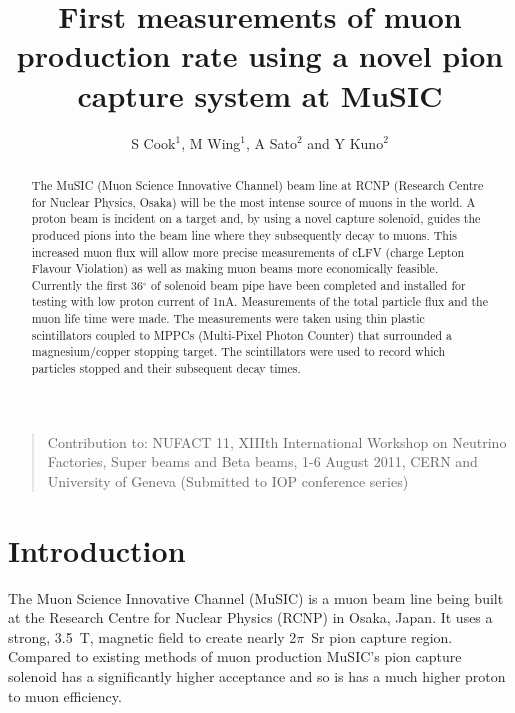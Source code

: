 \documentclass[a4paper]{jpconf}
\begin{document}
\title{First measurements of muon production rate using a novel pion capture system at MuSIC}

\author{S Cook$^1$, M Wing$^1$, A Sato$^2$ and Y Kuno$^2$}

\address{$^1$Department of Physics and Astronomy, University College London, Gower Street, London WC1E~6BT, UK}
\address{$^2$Department of Physics, Graduate School of Science, Osaka University.}


\begin{abstract}
The MuSIC (Muon Science Innovative Channel) beam line at RCNP (Research Centre for Nuclear Physics, Osaka) will be the most intense source of muons in the world. A proton beam is incident on a target and, by using a novel capture solenoid, guides the produced pions into the beam line where they subsequently decay to muons. This increased muon flux will allow more precise measurements of cLFV (charge Lepton Flavour Violation) as well as making muon beams more economically feasible. Currently the first 36$^{\circ}$ of solenoid beam pipe have been completed and installed for testing with low proton current of 1nA. Measurements of the total particle flux and the muon life time were made. The measurements were taken using thin plastic scintillators coupled to MPPCs (Multi-Pixel Photon Counter) that surrounded a magnesium/copper  stopping target. The scintillators were used to record which particles stopped and their subsequent decay times.
\end{abstract}    


\begin{quotation}
    \begin{center}
        Contribution to:
        NUFACT 11, XIIIth International Workshop on Neutrino Factories, Super beams and Beta beams, 1-6 August 2011, CERN and University of Geneva
        (Submitted to IOP conference series)
    \end{center}
\end{quotation}



\section{Introduction}
The Muon Science Innovative Channel (MuSIC) is a muon beam line being built at the Research Centre for Nuclear Physics (RCNP) in Osaka, Japan. It uses a strong, 3.5~T, magnetic field to create nearly 2$\pi$~Sr pion capture region. Compared to existing methods of muon production MuSIC's pion capture solenoid has a significantly higher acceptance and so is has a much higher proton to muon efficiency.
\end{document}
